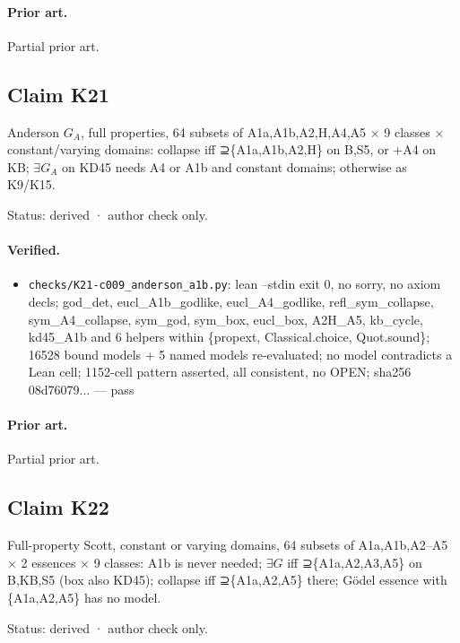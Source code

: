 \documentclass{article}
\begin{document}
\paragraph{Prior art.} Partial prior art.

\subsection*{Claim K21}

Anderson $G_A$, full properties, 64 subsets of A1a,A1b,A2,H,A4,A5 $\times$ 9 classes $\times$ constant/varying domains: collapse iff ⊇\{A1a,A1b,A2,H\} on B,S5, or +A4 on KB; $\exists G_A$ on KD45 needs A4 or A1b and constant domains; otherwise as K9/K15.

Status: derived · author check only.

\paragraph{Verified.}
\begin{itemize}
\item \texttt{checks/K21-c009\_anderson\_a1b.py}: lean --stdin exit 0, no sorry, no axiom decls; god\_det, eucl\_A1b\_godlike, eucl\_A4\_godlike, refl\_sym\_collapse, sym\_A4\_collapse, sym\_god, sym\_box, eucl\_box, A2H\_A5, kb\_cycle, kd45\_A1b and 6 helpers within \{propext, Classical.choice, Quot.sound\}; 16528 bound models + 5 named models re-evaluated; no model contradicts a Lean cell; 1152-cell pattern asserted, all consistent, no OPEN; sha256 08d76079... --- pass
\end{itemize}

\paragraph{Prior art.} Partial prior art.

\subsection*{Claim K22}

Full-property Scott, constant or varying domains, 64 subsets of A1a,A1b,A2--A5 $\times$ 2 essences $\times$ 9 classes: A1b is never needed; $\exists G$ iff ⊇\{A1a,A2,A3,A5\} on B,KB,S5 (box also KD45); collapse iff ⊇\{A1a,A2,A5\} there; Gödel essence with \{A1a,A2,A5\} has no model.

Status: derived · author check only.
\end{document}
